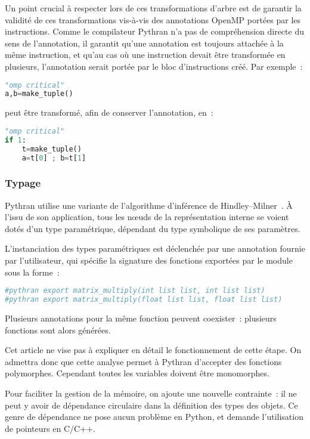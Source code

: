 \documentclass[renpar]{compas2013}
\begin{document}
Un point crucial à respecter lors de ces transformations d'arbre est de
garantir la validité de ces transformations vis-à-vis des annotations
OpenMP portées par les instructions. Comme le compilateur Pythran n'a pas
de compréhension directe du sens de l'annotation, il garantit qu'une
annotation est toujours attachée à la même instruction, et qu'au cas où
une instruction devait être transformée en plusieurs, l'annotation serait
portée par le bloc d'instructions créé. Par exemple~:
%
\begin{lstlisting}[language=python]
"omp critical"
a,b=make_tuple()
\end{lstlisting}
%
\noindent peut être transformé, afin de conserver l'annotation,  en~:
\begin{lstlisting}[language=python]
"omp critical"
if 1:
	t=make_tuple()
	a=t[0] ; b=t[1]
\end{lstlisting}
%

\subsubsection{Typage}

Pythran utilise une variante de l'algorithme d'inférence de
Hindley--Milner~\cite{milner78}. À l'issu de son application, tous les
nœuds de la représentation interne se voient dotés d'un type paramétrique,
dépendant du type symbolique de ses paramètres.

L'instanciation des types paramétriques est déclenchée par une annotation
fournie par l'utilisateur, qui spécifie la signature des fonctions
exportées par le module sous la forme~:
%
\begin{lstlisting}[language=python]
#pythran export matrix_multiply(int list list, int list list)
#pythran export matrix_multiply(float list list, float list list)
\end{lstlisting}
%
Plusieurs annotations pour la même fonction peuvent coexister~: plusieurs
fonctions sont alors générées.

Cet article ne vise pas à expliquer en détail le fonctionnement de cette étape.
On admettra donc que cette analyse permet à Pythran d'accepter des fonctions
polymorphes. Cependant toutes les variables doivent être monomorphes.

Pour faciliter la gestion de la mémoire, on ajoute une nouvelle
contrainte~: il ne peut y avoir de dépendance circulaire dans la
définition des types des objets. Ce genre de dépendance ne pose aucun
problème en Python, et demande l'utilisation de pointeurs en C/C++.
\end{document}
